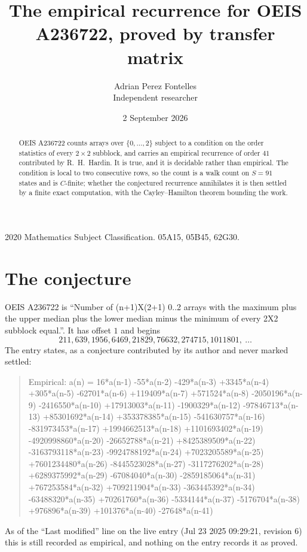 \documentclass[11pt,a4paper]{article}
\title{The empirical recurrence for OEIS A236722, proved by transfer matrix}
\author{Adrian Perez Fontelles\\ \small Independent researcher}
\date{2 September 2026}
\theoremstyle{plain}
\theoremstyle{definition}
\begin{document}
\maketitle

\begin{abstract}
OEIS A236722 counts arrays over $\{0,\dots,2\}$ subject to a condition on the order
statistics of every $2\times2$ subblock, and carries an empirical recurrence of order
$41$ contributed by R.~H.~Hardin. It is true, and it is decidable rather than empirical.
The condition is local to two consecutive rows, so the count is a walk count on $S=91$
states and is $C$-finite; whether the conjectured recurrence annihilates it is then settled by
a finite exact computation, with the Cayley--Hamilton theorem bounding the work.
\end{abstract}

\noindent\small 2020 Mathematics Subject Classification. 05A15, 05B45, 62G30.\normalsize

\section{The conjecture}

OEIS A236722 is ``Number of (n+1)X(2+1) 0..2 arrays with the maximum plus the upper median plus the lower median minus the minimum of every 2X2 subblock equal.''. It has offset $1$ and begins
\[
211, 639, 1956, 6469, 21829, 76632, 274715, 1011801,\ \dots
\]
The entry states, as a conjecture contributed by its author and never marked settled:
\begin{quote}
Empirical: a(n) = 16*a(n-1) -55*a(n-2) -429*a(n-3) +3345*a(n-4) +305*a(n-5) -62701*a(n-6) +119409*a(n-7) +571524*a(n-8) -2050196*a(n-9) -2416550*a(n-10) +17913003*a(n-11) -1900329*a(n-12) -97846713*a(n-13) +85301692*a(n-14) +353378385*a(n-15) -541630757*a(n-16) -831973453*a(n-17) +1994662513*a(n-18) +1101693402*a(n-19) -4920998860*a(n-20) -26652788*a(n-21) +8425389509*a(n-22) -3163793118*a(n-23) -9924788192*a(n-24) +7023205589*a(n-25) +7601234480*a(n-26) -8445523028*a(n-27) -3117276202*a(n-28) +6289375992*a(n-29) -67084040*a(n-30) -2859185064*a(n-31) +767253584*a(n-32) +709211904*a(n-33) -363445392*a(n-34) -63488320*a(n-35) +70261760*a(n-36) -5334144*a(n-37) -5176704*a(n-38) +976896*a(n-39) +101376*a(n-40) -27648*a(n-41)
\end{quote}
As of the ``Last modified'' line on the live entry (Jul 23 2025 09:29:21, revision 6) this is still
recorded as empirical, and nothing on the entry records it as proved.
\end{document}
